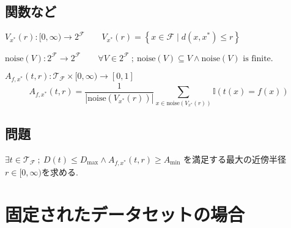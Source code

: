 \documentclass[dvipdfmx,10.5pt]{jsarticle}
\newcommand{\noise}{\mathrm{noise}}
\newcommand{\depth}{D}
\newcommand{\dist}{d}
\newcommand{\NNR}{[0,\infty)}
\newcommand{\mywidth}{\widthof{\bfseries データセットのサイズ }}
\numberwithin{equation}{part}
\begin{document}
\subsection{関数など}
\begin{description}[leftmargin=!,labelwidth=\mywidth]
  \item[近傍] 
  $
    V_{x^*}(r):\NNR\to 2^\mathcal{F}\quad\quad
    V_{x^*}(r)=\left\{x\in\mathcal{F}\mid\dist(x,x^*)\le r\right\}
  $
\end{description}
\begin{description}[leftmargin=!,labelwidth=\mywidth]
  \item[ノイズ集合] 
  $
    \noise(V):2^\mathcal{F}\to2^\mathcal{F}\quad\quad
    \forall V\in2^\mathcal{F}\ ;\ \noise(V)\subseteq
    V\wedge\noise(V)\text{ is finite.}
  $
\end{description}
\begin{description}[leftmargin=!,labelwidth=\mywidth]
  \item[近似精度]
  $A_{f,x^*}(t,r):\mathcal{T}_\mathcal{F}\times\NNR\to[0,1]$
  $$
    A_{f,x^*}(t,r)=\frac{1}{|\noise(V_{x^*}(r))|}
    \sum_{x\in\noise(V_{x^*}(r))}\mathbb{I}(t(x)=f(x))
  $$
\end{description}

\subsection{問題}
$
  \exists t\in \mathcal{T}_\mathcal{F}\ ;
  \ \depth(t)\le \depth_\mathrm{max}\wedge
  A_{f,x^*}(t,r)\ge A_\mathrm{min}
$
を満足する最大の近傍半径$r\in\NNR$を求める. 

\newpage
\section{固定されたデータセットの場合}
\end{document}
